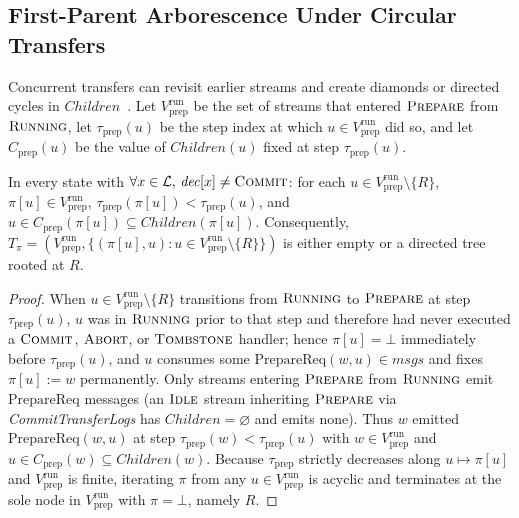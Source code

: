 \documentclass[sigconf,nonacm]{acmart}
\newcommand{\stIdle}{\textsc{Idle}}
\newcommand{\stRun}{\textsc{Running}}
\newcommand{\stPrep}{\textsc{Prepare}}
\newcommand{\stCom}{\textsc{Commit}}
\newcommand{\stAbt}{\textsc{Abort}}
\newcommand{\stTomb}{\textsc{Tombstone}}
\newcommand{\Children}{\mathit{Children}}
\newcommand{\dec}{\mathit{dec}}
\begin{document}
\subsection{First-Parent Arborescence Under Circular Transfers}
\label{sec:arborescence}
Concurrent transfers can revisit earlier streams and create diamonds or
directed cycles in \(\Children\)~\cite[\S4.6]{tree2pc}. Let
\(V_{\mathrm{prep}}^{\mathrm{run}}\) be the set of streams that entered
\(\stPrep\) from \(\stRun\), let \(\tau_{\mathrm{prep}}(u)\) be the step
index at which \(u \in V_{\mathrm{prep}}^{\mathrm{run}}\) did so, and let
\(C_{\mathrm{prep}}(u)\) be the value of \(\Children(u)\) fixed at step
\(\tau_{\mathrm{prep}}(u)\).

\begin{lemma}\label{lem:arborescence}
In every state with \(\forall x \in \mathcal{L},\, \dec[x] \neq \stCom\):
for each \(u \in V_{\mathrm{prep}}^{\mathrm{run}} \setminus \{R\}\),
\(\pi[u] \in V_{\mathrm{prep}}^{\mathrm{run}}\), \(\tau_{\mathrm{prep}}(\pi[u])
< \tau_{\mathrm{prep}}(u)\), and \(u \in C_{\mathrm{prep}}(\pi[u]) \subseteq
\Children(\pi[u])\). Consequently, \(T_\pi = (V_{\mathrm{prep}}^{\mathrm{run}},
\{(\pi[u], u) : u \in V_{\mathrm{prep}}^{\mathrm{run}} \setminus \{R\}\})\)
is either empty or a directed tree rooted at \(R\).
\end{lemma}

\begin{proof}
When \(u \in V_{\mathrm{prep}}^{\mathrm{run}} \setminus \{R\}\) transitions
from \(\stRun\) to \(\stPrep\) at step \(\tau_{\mathrm{prep}}(u)\), \(u\) was
in \(\stRun\) prior to that step and therefore had never executed a
\(\stCom\), \(\stAbt\), or \(\stTomb\) handler; hence \(\pi[u] = \bot\)
immediately before \(\tau_{\mathrm{prep}}(u)\), and \(u\) consumes some
\(\mathrm{PrepareReq}(w, u) \in \mathit{msgs}\) and fixes \(\pi[u] := w\)
permanently. Only streams entering \(\stPrep\) from \(\stRun\) emit
\(\mathrm{PrepareReq}\) messages (an \(\stIdle\) stream inheriting
\(\stPrep\) via \emph{CommitTransferLogs} has \(\Children = \varnothing\) and
emits none). Thus \(w\) emitted \(\mathrm{PrepareReq}(w, u)\) at step
\(\tau_{\mathrm{prep}}(w) < \tau_{\mathrm{prep}}(u)\) with \(w \in
V_{\mathrm{prep}}^{\mathrm{run}}\) and \(u \in C_{\mathrm{prep}}(w)
\subseteq \Children(w)\). Because \(\tau_{\mathrm{prep}}\) strictly decreases
along \(u \mapsto \pi[u]\) and \(V_{\mathrm{prep}}^{\mathrm{run}}\) is
finite, iterating \(\pi\) from any \(u \in V_{\mathrm{prep}}^{\mathrm{run}}\)
is acyclic and terminates at the sole node in
\(V_{\mathrm{prep}}^{\mathrm{run}}\) with \(\pi = \bot\), namely \(R\).
\end{proof}
\end{document}
